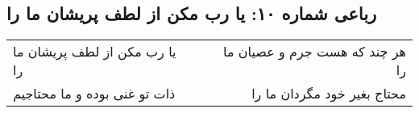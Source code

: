 \begin{center}
\section*{رباعی شماره ۱۰: یا رب مکن از لطف پریشان ما را}
\label{sec:sh010}
\begin{longtable}{l p{0.5cm} r}
یا رب مکن از لطف پریشان ما را
&&
هر چند که هست جرم و عصیان ما را
\\
ذات تو غنی بوده و ما محتاجیم
&&
محتاج بغیر خود مگردان ما را
\\
\end{longtable}
\end{center}
